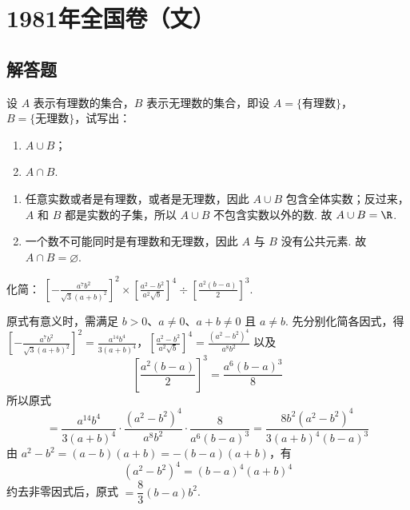 \documentclass[UTF8,a4paper,oneside,11pt]{ctexbook}
\begin{document}
\mainmatter

\chapter{1981年全国卷（文）}

\section{解答题}

\begin{problem}
设 \(A\) 表示有理数的集合，\(B\) 表示无理数的集合，即设 \(A = \{\text{有理数}\}\)，\(B = \{\text{无理数}\}\)，试写出：

\begin{enumerate}
\item \(A \cup B\)；
\item \(A \cap B\).
\end{enumerate}
\end{problem}

\begin{solution}
\begin{enumerate}
\item 任意实数或者是有理数，或者是无理数，因此 \(A\cup B\) 包含全体实数；反过来，\(A\) 和 \(B\) 都是实数的子集，所以 \(A\cup B\) 不包含实数以外的数. 故 \(A\cup B=\R\).
\item 一个数不可能同时是有理数和无理数，因此 \(A\) 与 \(B\) 没有公共元素. 故 \(A\cap B=\varnothing\).
\end{enumerate}
\end{solution}

\begin{problem}
化简： \(\left[-\frac{a^7b^2}{\sqrt{3}(a+b)^2}\right]^2\times \left[\frac{a^2-b^2}{a^2\sqrt{b}}\right]^4\div \left[\frac{a^2(b-a)}{2}\right]^3\).
\end{problem}

\begin{solution}
原式有意义时，需满足 \(b>0\)、\(a\ne0\)、\(a+b\ne0\) 且 \(a\ne b\). 先分别化简各因式，得
\(\left[-\frac{a^7b^2}{\sqrt{3}(a+b)^2}\right]^2=\frac{a^{14}b^4}{3(a+b)^4}\)，\(\left[\frac{a^2-b^2}{a^2\sqrt b}\right]^4=\frac{(a^2-b^2)^4}{a^8b^2}\)
以及
\[
\left[\frac{a^2(b-a)}{2}\right]^3=\frac{a^6(b-a)^3}{8}
\]
所以原式
\[
=\frac{a^{14}b^4}{3(a+b)^4}\cdot\frac{(a^2-b^2)^4}{a^8b^2}\cdot\frac{8}{a^6(b-a)^3}
=\frac{8b^2(a^2-b^2)^4}{3(a+b)^4(b-a)^3}
\]
由 \(a^2-b^2=(a-b)(a+b)=-(b-a)(a+b)\)，有
\[
(a^2-b^2)^4=(b-a)^4(a+b)^4
\]
约去非零因式后，原式 \(=\dfrac{8}{3}(b-a)b^2\).
\end{solution}
\end{document}

